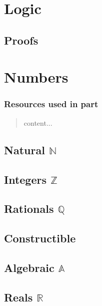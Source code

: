 \documentclass[12pt, english]{book}
\newenvironment{partintro}
{\vspace*{\fill}
	\section*{\centering Resources used in part \thepart}
	\begin{quotation}}
	{\end{quotation}\vspace*{\fill}\newpage}
\begin{document}
	
	\section*{}
	\tableofcontents
	
	\mainmatter
	\part{Logic} \label{Logic Part}
	
	\chapter{Proofs}
	
	
	\part{Numbers} \label{Numbers Part}
	\begin{partintro}
		content...
	\end{partintro}
	
	\chapter{Natural $\mathbb{N}$} \label{Natural Chapter - Numbers}
	
	\chapter{Integers $\mathbb{Z}$} \label{Integers Chapter - Numbers}
	
	\chapter{Rationals $\mathbb{Q}$} \label{Rationals Chapter - Numebers}
	
	\chapter{Constructible} \label{Constructible Chapter - Numbers}
	
	\chapter{Algebraic $\mathbb{A}$} \label{Algebraic Chapter - Numbers}
	
	\chapter{Reals $\mathbb{R}$} \label{Reals Chapter - Numbers}
	
\end{document}
